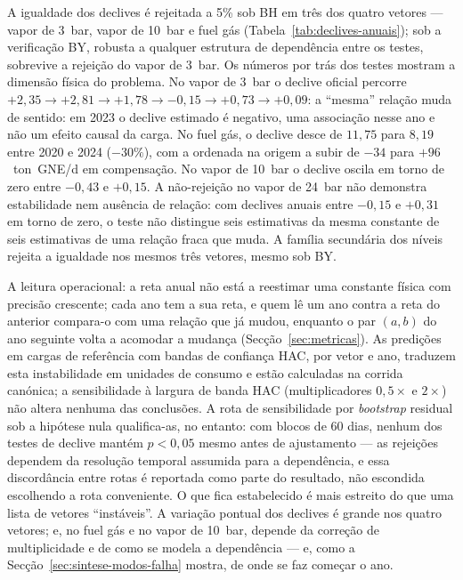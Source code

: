 A igualdade dos declives é rejeitada a 5\% sob BH em três dos quatro vetores
--- vapor de 3~bar, vapor de 10~bar e fuel gás
(Tabela~\ref{tab:declives-anuais}); sob a verificação BY, robusta a qualquer
estrutura de dependência entre os testes, sobrevive a rejeição do vapor de
3~bar. Os números por trás dos testes mostram a dimensão física do problema.
No vapor de 3~bar o declive oficial percorre $+2{,}35 \to +2{,}81 \to +1{,}78
\to -0{,}15 \to +0{,}73 \to +0{,}09$: a ``mesma'' relação muda de sentido: em
2023 o declive estimado é negativo, uma associação nesse ano e não um efeito
causal da carga. No fuel gás, o
declive desce de $11{,}75$ para $8{,}19$ entre 2020 e 2024 (${-}30\%$), com a
ordenada na origem a subir de $-34$ para $+96$~ton~GNE/d em compensação. No
vapor de 10~bar o declive oscila em torno de zero entre $-0{,}43$ e $+0{,}15$.
A não-rejeição no vapor de 24~bar não demonstra estabilidade nem ausência de
relação: com declives anuais entre $-0{,}15$ e $+0{,}31$ em torno de zero, o
teste não distingue seis estimativas da mesma constante de seis estimativas
de uma relação fraca que muda. A família secundária dos níveis
rejeita a igualdade nos mesmos três vetores, mesmo sob BY.

A leitura operacional: a reta anual não está a reestimar uma constante
física com precisão crescente; cada ano tem a sua reta, e quem lê um ano
contra a reta do anterior compara-o com uma relação que já mudou, enquanto
o par $(a, b)$ do ano seguinte volta a acomodar a mudança
(Secção~\ref{sec:metricas}). As predições em cargas de referência com bandas
de confiança HAC, por vetor e ano, traduzem esta instabilidade em unidades
de consumo e estão calculadas na corrida canónica; a sensibilidade à largura de banda HAC (multiplicadores $0{,}5\times$ e
$2\times$) não altera nenhuma das conclusões. A rota de sensibilidade por
\emph{bootstrap} residual sob a hipótese nula qualifica-as, no entanto: com
blocos de 60 dias, nenhum dos testes de declive mantém $p<0{,}05$ mesmo antes
de ajustamento --- as rejeições dependem da resolução temporal assumida para
a dependência, e essa discordância entre rotas é reportada como parte do
resultado, não escondida escolhendo a rota conveniente. O que fica
estabelecido é mais estreito do que uma lista de vetores ``instáveis''. A
variação pontual dos declives é grande nos quatro vetores;  e, no fuel gás
e no vapor de 10~bar, depende da correção de multiplicidade e de como se
modela a dependência --- e, como a Secção~\ref{sec:sintese-modos-falha}
mostra, de onde se faz começar o ano.

